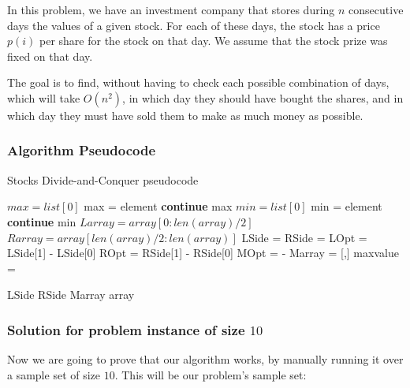 \documentclass{article}
\begin{document}
In this problem, we have an investment company that stores during $n$ consecutive days the values of a given stock. For each of these days, the stock has a price $p(i)$ per share for the stock on that day. We assume that the stock prize was fixed on that day.

The goal is to find, without having to check each possible combination of days, which will take $O(n^2)$, in which day they should have bought the shares, and in which day they must have sold them to make as much money as possible.

\subsubsection*{Algorithm Pseudocode}

\begin{algorithm}[H]
\caption{Stocks Divide-and-Conquer pseudocode}
\begin{algorithmic}[1]
 \State $max = list[0]$
   \State max = element
  \Else{}
   \State \textbf{continue}
  \EndIf
 \EndFor
 \State \Return max
\EndFunction
\State
{}
 \State $min = list[0]$
   \State min = element
  \Else{}
   \State \textbf{continue}
  \EndIf
 \EndFor
 \State \Return min
\EndFunction
\State
{}
 \State $Larray = array[0:len(array)/2]$
 \State $Rarray = array[len(array)/2:len(array)]$
 \State
 \State LSide = 
 \State RSide = 
 \State
 \State LOpt = LSide[1] - LSide[0]
 \State ROpt = RSide[1] - RSide[0]
 \State MOpt =  - 
 \State
 \State Marray = [,]
 \State
 \State maxvalue = 

  \State \Return LSide
  \State \Return RSide
  \State \Return Marray
 \EndIf
 \State
{}
 \State \Return array
\EndIf
\EndFunction
\end{algorithmic}
\end{algorithm}

\subsubsection*{Solution for problem instance of size $10$}

Now we are going to prove that our algorithm works, by manually running it over a sample set of size $10$. This will be our problem's sample set:
\end{document}
